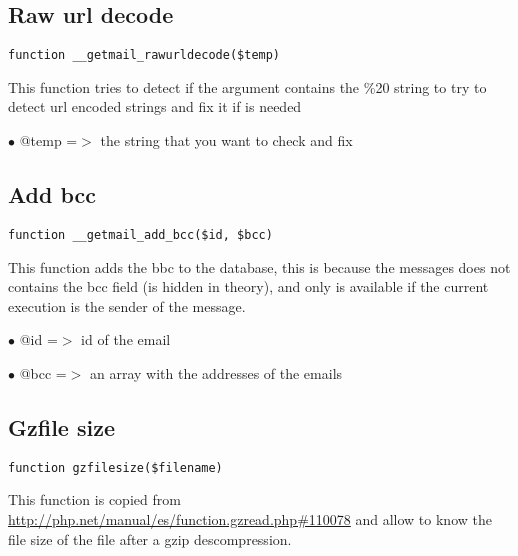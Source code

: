 \documentclass[a4paper]{book}
\def\htmladdnormallink#1#2{\href{#2}{#1}}
\begin{document}
\hypertarget{toc52}{}
\subsection{Raw url decode}

\begin{lstlisting}
function __getmail_rawurldecode($temp)
\end{lstlisting}

This function tries to detect if the argument contains the \%20 string
to try to detect url encoded strings and fix it if is needed

\begin{compactitem}
\item[\color{myblue}$\bullet$] @temp =$>$ the string that you want to check and fix
\end{compactitem}

\hypertarget{toc53}{}
\subsection{Add bcc}

\begin{lstlisting}
function __getmail_add_bcc($id, $bcc)
\end{lstlisting}

This function adds the bbc to the database, this is because the messages
does not contains the bcc field (is hidden in theory), and only is available
if the current execution is the sender of the message.

\begin{compactitem}
\item[\color{myblue}$\bullet$] @id  =$>$ id of the email
\item[\color{myblue}$\bullet$] @bcc =$>$ an array with the addresses of the emails
\end{compactitem}

\hypertarget{toc54}{}
\subsection{Gzfile size}

\begin{lstlisting}
function gzfilesize($filename)
\end{lstlisting}

This function is copied from \htmladdnormallink{http://php.net/manual/es/function.gzread.php\#110078}{http://php.net/manual/es/function.gzread.php\#110078}
and allow to know the file size of the file after a gzip descompression.
\end{document}
